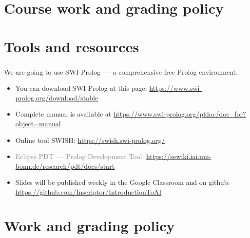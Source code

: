 \frame[plain]{\titlepage}


\section{Course work and grading policy}

\section{Tools and resources}

\begin{frame}
	\frametitle{\insertsection}
	We are going to use SWI-Prolog~--- a comprehensive free Prolog environment.
	\begin{itemize}
		\item You can download SWI-Prolog at this page: \href{https://www.swi-prolog.org/download/stable}{https://www.swi-prolog.org/download/stable}
		\item Complete manual is available at \href{https://www.swi-prolog.org/pldoc/doc_for?object=manual}{https://www.swi-prolog.org/pldoc/doc\_for?object=manual}
		\item Online tool SWISH: \href{https://swish.swi-prolog.org/}{https://swish.swi-prolog.org/}
		\item \textcolor{gray}{Eclipse PDT~--- Prolog Development Tool:} \href{https://sewiki.iai.uni-bonn.de/research/pdt/docs/start}{https://sewiki.iai.uni-bonn.de/research/pdt/docs/start}
		\item Slides will be published weekly in the Google Classroom and on github: \href{https://github.com/Inscriptor/IntroductionToAI}{https://github.com/Inscriptor/IntroductionToAI}
	\end{itemize}
\end{frame}


\section{Work and grading policy}

